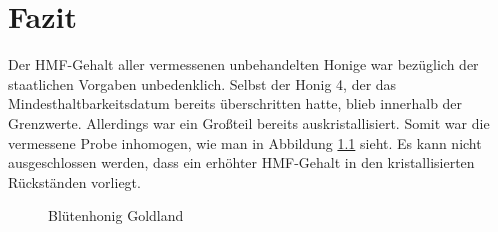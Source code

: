\chapter{Fazit}
Der HMF-Gehalt aller vermessenen unbehandelten Honige war bezüglich der staatlichen Vorgaben unbedenklich. Selbst der Honig 4, der das Mindesthaltbarkeitsdatum bereits überschritten hatte, blieb innerhalb der Grenzwerte. Allerdings war ein Großteil bereits auskristallisiert. Somit war die vermessene Probe inhomogen, wie man in Abbildung \ref{fig:Blütenhonig} sieht. Es kann nicht ausgeschlossen werden, dass ein erhöhter HMF-Gehalt in den kristallisierten Rückständen vorliegt.\\
\begin{figure}[htbp]
  \centering
  \caption{Blütenhonig Goldland}
  \label{fig:Blütenhonig}
\end{figure}

